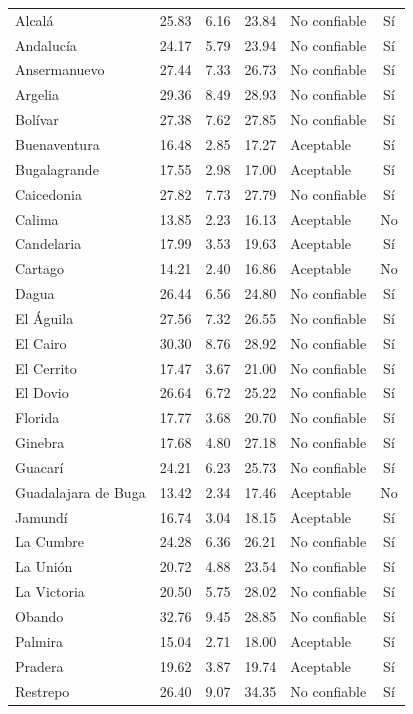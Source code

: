 \begin{longtable}{p{3.4cm} r r r l c}
Alcalá & 25.83 & 6.16 & 23.84 & No confiable & Sí \\
Andalucía & 24.17 & 5.79 & 23.94 & No confiable & Sí \\
Ansermanuevo & 27.44 & 7.33 & 26.73 & No confiable & Sí \\
Argelia & 29.36 & 8.49 & 28.93 & No confiable & Sí \\
Bolívar & 27.38 & 7.62 & 27.85 & No confiable & Sí \\
Buenaventura & 16.48 & 2.85 & 17.27 & Aceptable & Sí \\
Bugalagrande & 17.55 & 2.98 & 17.00 & Aceptable & Sí \\
Caicedonia & 27.82 & 7.73 & 27.79 & No confiable & Sí \\
Calima & 13.85 & 2.23 & 16.13 & Aceptable & No \\
Candelaria & 17.99 & 3.53 & 19.63 & Aceptable & Sí \\
Cartago & 14.21 & 2.40 & 16.86 & Aceptable & No \\
Dagua & 26.44 & 6.56 & 24.80 & No confiable & Sí \\
El Águila & 27.56 & 7.32 & 26.55 & No confiable & Sí \\
El Cairo & 30.30 & 8.76 & 28.92 & No confiable & Sí \\
El Cerrito & 17.47 & 3.67 & 21.00 & No confiable & Sí \\
El Dovio & 26.64 & 6.72 & 25.22 & No confiable & Sí \\
Florida & 17.77 & 3.68 & 20.70 & No confiable & Sí \\
Ginebra & 17.68 & 4.80 & 27.18 & No confiable & Sí \\
Guacarí & 24.21 & 6.23 & 25.73 & No confiable & Sí \\
Guadalajara de Buga & 13.42 & 2.34 & 17.46 & Aceptable & No \\
Jamundí & 16.74 & 3.04 & 18.15 & Aceptable & Sí \\
La Cumbre & 24.28 & 6.36 & 26.21 & No confiable & Sí \\
La Unión & 20.72 & 4.88 & 23.54 & No confiable & Sí \\
La Victoria & 20.50 & 5.75 & 28.02 & No confiable & Sí \\
Obando & 32.76 & 9.45 & 28.85 & No confiable & Sí \\
Palmira & 15.04 & 2.71 & 18.00 & Aceptable & Sí \\
Pradera & 19.62 & 3.87 & 19.74 & Aceptable & Sí \\
Restrepo & 26.40 & 9.07 & 34.35 & No confiable & Sí \\

\end{longtable}
